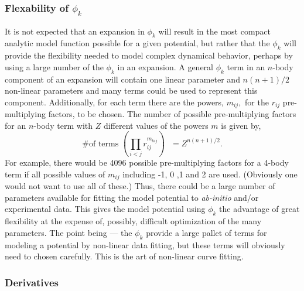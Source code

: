 \documentclass[12pt,thmsa]{article}
\begin{document}
\subsubsection{Flexability of $\phi _k$}

It is not expected that an expansion in $\phi _k$ will result in the most
compact analytic model function possible for a given potential, but rather
that the $\phi _k$ will provide the flexibility needed to model complex
dynamical behavior, perhaps by using a large number of the $\phi _k$ in an
expansion. A general $\phi _k$ term in an $n$-body component of an expansion
will contain one linear parameter and $n\left( n+1\right) /2$ non-linear
parameters and many terms could be used to represent this component.
Additionally, for each term there are the powers, $m_{ij},$ for the $r_{ij}$
pre-multiplying factors, to be chosen. The number of possible
pre-multiplying factors for an $n$-body term with $Z$ different values of
the powers $m$ is given by, 
\begin{equation}
\text{\# of terms }\left( \prod_{i<j}r_{ij}^{m_{kij}}\right) \text{ }%
=Z^{n\left( n+1\right) /2}.
\end{equation}
For example, there would be 4096 possible pre-multiplying factors for a
4-body term if all possible values of $m_{ij}$ including -1, 0 ,1 and 2 are
used. (Obviously one would not want to use all of these.) Thus, there could
be a large number of parameters available for fitting the model potential to 
\emph{ab-initio} and/or experimental data. This gives the model potential
using $\phi _k$ the advantage of great flexibility at the expense of,
possibly, difficult optimization of the many parameters. The point being ---
the $\phi _k$ provide a large pallet of terms for modeling a potential by
non-linear data fitting, but these terms will obviously need to chosen
carefully. This is the art of non-linear curve fitting.

\subsubsection{Derivatives}
\end{document}
